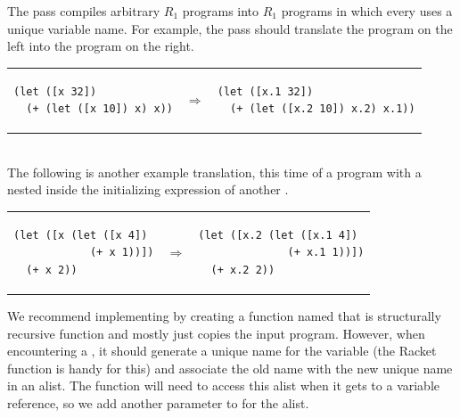 \documentclass[11pt]{book}
\begin{document}
The  pass compiles arbitrary $R_1$ programs into $R_1$
programs in which every  uses a unique variable name. For
example, the  pass should translate the program on the
left into the program on the right. \\
\begin{tabular}{lll}
\begin{minipage}{0.4\textwidth}
\begin{lstlisting}
(let ([x 32])
  (+ (let ([x 10]) x) x))
\end{lstlisting}
\end{minipage}
&
$\Rightarrow$
&
\begin{minipage}{0.4\textwidth}
\begin{lstlisting}
(let ([x.1 32])
  (+ (let ([x.2 10]) x.2) x.1))
\end{lstlisting}
\end{minipage}
\end{tabular} \\
%
The following is another example translation, this time of a program
with a  nested inside the initializing expression of another
.\\
\begin{tabular}{lll}
\begin{minipage}{0.4\textwidth}
\begin{lstlisting}
(let ([x (let ([x 4])
            (+ x 1))])
  (+ x 2))
\end{lstlisting}
\end{minipage}
&
$\Rightarrow$
&
\begin{minipage}{0.4\textwidth}
\begin{lstlisting}
(let ([x.2 (let ([x.1 4])
              (+ x.1 1))])
  (+ x.2 2))
\end{lstlisting}
\end{minipage}
\end{tabular}

We recommend implementing  by creating a function named
 that is structurally recursive function and mostly
just copies the input program. However, when encountering a ,
it should generate a unique name for the variable (the Racket function
 is handy for this) and associate the old name with the
new unique name in an alist. The 
function will need to access this alist when it gets to a
variable reference, so we add another parameter to 
for the alist.
\end{document}
